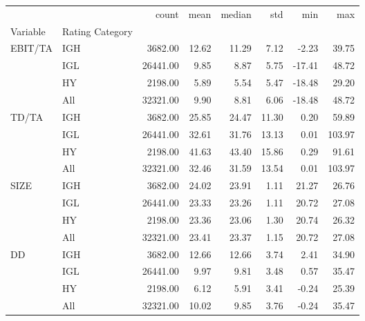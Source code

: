 \begin{tabular}{llrrrrrr}
\toprule
 &  & count & mean & median & std & min & max \\
Variable & Rating Category &  &  &  &  &  &  \\
\midrule
\multirow[t]{4}{*}{EBIT/TA} & IGH & 3682.00 & 12.62 & 11.29 & 7.12 & -2.23 & 39.75 \\
 & IGL & 26441.00 & 9.85 & 8.87 & 5.75 & -17.41 & 48.72 \\
 & HY & 2198.00 & 5.89 & 5.54 & 5.47 & -18.48 & 29.20 \\
 & All & 32321.00 & 9.90 & 8.81 & 6.06 & -18.48 & 48.72 \\
\cline{1-8}
\multirow[t]{4}{*}{TD/TA} & IGH & 3682.00 & 25.85 & 24.47 & 11.30 & 0.20 & 59.89 \\
 & IGL & 26441.00 & 32.61 & 31.76 & 13.13 & 0.01 & 103.97 \\
 & HY & 2198.00 & 41.63 & 43.40 & 15.86 & 0.29 & 91.61 \\
 & All & 32321.00 & 32.46 & 31.59 & 13.54 & 0.01 & 103.97 \\
\cline{1-8}
\multirow[t]{4}{*}{SIZE} & IGH & 3682.00 & 24.02 & 23.91 & 1.11 & 21.27 & 26.76 \\
 & IGL & 26441.00 & 23.33 & 23.26 & 1.11 & 20.72 & 27.08 \\
 & HY & 2198.00 & 23.36 & 23.06 & 1.30 & 20.74 & 26.32 \\
 & All & 32321.00 & 23.41 & 23.37 & 1.15 & 20.72 & 27.08 \\
\cline{1-8}
\multirow[t]{4}{*}{DD} & IGH & 3682.00 & 12.66 & 12.66 & 3.74 & 2.41 & 34.90 \\
 & IGL & 26441.00 & 9.97 & 9.81 & 3.48 & 0.57 & 35.47 \\
 & HY & 2198.00 & 6.12 & 5.91 & 3.41 & -0.24 & 25.39 \\
 & All & 32321.00 & 10.02 & 9.85 & 3.76 & -0.24 & 35.47 \\
\cline{1-8}
\bottomrule
\end{tabular}
